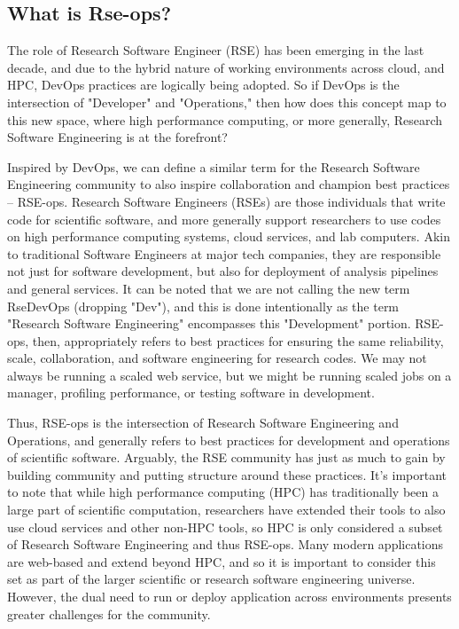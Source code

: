 \subsection{What is Rse-ops?}

The role of Research Software Engineer (RSE) has been emerging in the last decade, and due to the hybrid nature of working environments across cloud, and HPC, DevOps practices are logically being adopted. So if DevOps is the intersection of  "Developer" and "Operations," then how does this concept map to this new space, where high performance computing, or more generally, Research Software Engineering is at the forefront?

Inspired by DevOps, we can define a similar term for the Research Software Engineering community to also inspire collaboration and champion best practices -- RSE-ops. Research Software Engineers (RSEs) \cite{rse-history} are those individuals that write code for scientific software, and more generally support researchers to use codes on high performance computing systems, cloud services, and lab computers.
Akin to traditional Software Engineers at major tech companies, they are responsible not just for software development, but also for deployment of analysis pipelines and general services.
It can be noted that we are not calling the new term RseDevOps (dropping "Dev"), and this is done intentionally as the term "Research Software Engineering" encompasses this "Development" portion. RSE-ops, then, appropriately refers to best practices for ensuring the same reliability, scale, collaboration, and software engineering for research codes. We may not always be running a scaled web service, but we might be running scaled jobs on a manager, profiling performance, or testing software in development.

Thus, RSE-ops is the intersection of Research Software Engineering and Operations, and generally refers to best practices for development and operations of scientific software.
Arguably, the RSE community has just as much to gain by building community and putting structure around these practices.
It's important to note that while high performance computing (HPC) has traditionally been a large part of scientific computation, researchers have extended their tools to also use cloud services and other non-HPC tools, so HPC is only considered a subset of Research Software Engineering and thus RSE-ops. Many modern applications are web-based and extend beyond HPC, and so it is important to consider this set as part of the larger scientific or research software engineering universe. However, the dual need to run or deploy application across environments presents greater challenges for the community.  


